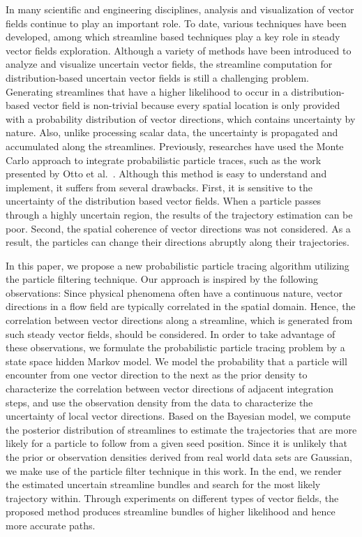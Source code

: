 \documentclass[review]{vgtc}                 %
\begin{document}
In many scientific and engineering disciplines, analysis and visualization of vector fields continue to play an important role. To date, various techniques have been developed, among which streamline based techniques play a key role in steady vector fields exploration. Although a variety of methods have been introduced to analyze and visualize uncertain vector fields, the streamline computation for distribution-based uncertain vector fields is still a challenging problem. Generating streamlines that have a higher likelihood to occur in a distribution-based vector field is non-trivial because every spatial location is only provided with a probability distribution of vector directions, which contains uncertainty by nature. Also, unlike processing scalar data, the uncertainty is propagated and accumulated along the streamlines. Previously, researches have used the Monte Carlo approach to integrate probabilistic particle traces, such as the work presented by Otto et al.~\cite{Otto10a, Otto11a}. Although this method is easy to understand and implement, it suffers from several drawbacks. First, it is sensitive to the uncertainty of the distribution based vector fields. When a particle passes through a highly uncertain region, the results of the trajectory estimation can be poor. Second, the spatial coherence of vector directions was not considered. As a result, the particles can change their directions abruptly along their trajectories.

In this paper, we propose a new probabilistic particle tracing algorithm utilizing the particle filtering technique. Our approach is inspired by the following observations: Since physical phenomena often have a continuous nature, vector directions in a flow field are typically correlated in the spatial domain. Hence, the correlation between vector directions along a streamline, which is generated from such steady vector fields, should be considered. In order to take advantage of these observations, we formulate the probabilistic particle tracing problem by a state space hidden Markov model. We model the probability that a particle will encounter from one vector direction to the next as the prior density to characterize the correlation between vector directions of adjacent integration steps, and use the observation density from the data to characterize the uncertainty of local vector directions. Based on the Bayesian model, we compute the posterior distribution of streamlines to estimate the trajectories that are more likely for a particle to follow from a given seed position. Since it is unlikely that the prior or observation densities derived from real world data sets are Gaussian, we make use of the particle filter technique in this work. In the end, we render the estimated uncertain streamline bundles and search for the most likely trajectory within. Through experiments on different types of vector fields, the proposed method produces streamline bundles of higher likelihood and hence more accurate paths.
\end{document}
